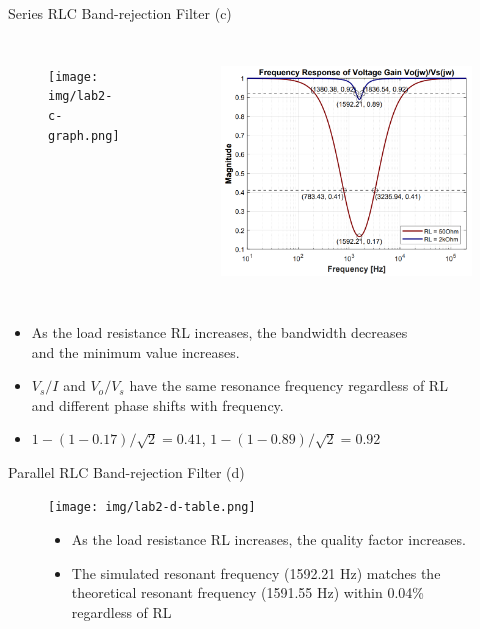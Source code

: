 \documentclass[t, 10pt, handout]{beamer}
\begin{document}
\begin{frame}{Series RLC Band-rejection Filter (c)}
	\begin{columns}
  
		\begin{figure}
		{\texttt{[image: img/lab2-c-graph.png]}}
		\end{figure}


  		\begin{figure}
		{\includegraphics[width=1.0\columnwidth]{img/lab2-d-graph.png}}
		\end{figure}
	\end{columns}
	\begin{itemize}
            \item As the load resistance RL increases, the bandwidth decreases \\
            and the minimum value increases.
            \item $V_s/I$ and $V_o/V_s$ have the same resonance frequency regardless of RL \\
            and different phase shifts with frequency.
    	\item $1-(1-0.17)/\sqrt{2} = 0.41$, $1-(1-0.89)/\sqrt{2} = 0.92$
    \end{itemize}   
\end{frame}	

\begin{frame}{Parallel RLC Band-rejection Filter (d)}
    \begin{figure}
        \centering
        \texttt{[image: img/lab2-d-table.png]}
        \begin{itemize}
            \item As the load resistance RL increases, the quality factor increases.
        \end{itemize}
	\begin{itemize}
		\item The simulated resonant frequency (1592.21 Hz) matches the theoretical resonant frequency (1591.55 Hz) within 0.04\% regardless of RL
	\end{itemize}   
    \end{figure}
\end{frame}
\end{document}
